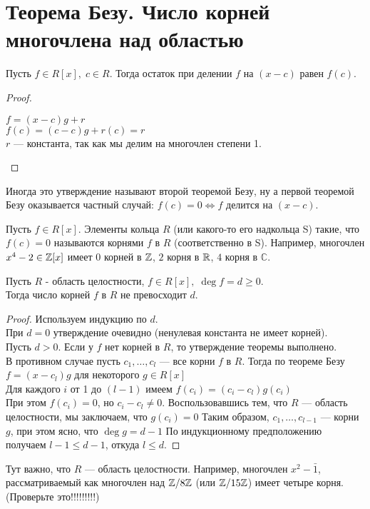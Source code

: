 
\section{Теорема Безу. Число корней многочлена над областью}
\begin{normalsize}
\begin{theorem-non}
    Пусть $f \in R[x],\; c \in R$. Тогда остаток при делении $f$ на $(x - c)$ равен $f(c)$.
\end{theorem-non}

\begin{proof}
    $ $ \\
    \begin{center}
        $f = (x-c)g + r$\\
        $f(c) = (c - c)g + r(c) = r$\\
        $r$ --- константа, так как мы делим на многочлен степени 1.
    \end{center}
    
\end{proof}

\notice Иногда это утверждение называют второй теоремой Безу, ну а первой теоремой Безу оказывается частный случай: $f(c) = 0 \Leftrightarrow f$ делится на $(x-c)$.

Пусть $f \in R[x]$. Элементы кольца $R$ (или какого-то его надкольца S) такие, что $f(c) = 0$ называются корнями $f$ в $R$ (соответственно в S).
Например, многочлен $x^4 - 2 \in \mathbb{Z}[x]$ имеет $0$ корней в $\mathbb{Z}$, $2$ корня в $\mathbb{R}$, $4$ корня в $\mathbb{C}$.

\begin{theorem-non}
    Пусть $R$ - область целостности, $f \in R[x],\; \deg f = d \geqslant 0$. \\
    Тогда число корней $f$ в $R$ не превосходит $d$.
\end{theorem-non}

\begin{proof}
    Используем индукцию по $d$. \\
    При $d = 0$ утверждение очевидно (ненулевая константа не имеет корней). \\
    Пусть $d > 0$. Если у $f$ нет корней в $R$, то утверждение теоремы выполнено. \\
    В противном случае пусть $c_1, \dots, c_l$ --- все корни $f$ в $R$. Тогда по теореме Безу
    $f = (x - c_l)g$ для некоторого $g \in R[x]$ \\
    Для каждого $i$ от 1 до $(l-1)$ имеем $f(c_i) = (c_i - c_l)g(c_i)$\\
    При этом $f(c_i) = 0$, но $c_i - c_l \neq 0$. Воспользовавшись тем, что $R$ --- область целостности, мы заключаем, что $g(c_i) = 0$
    Таким образом, $c_1,\dots,c_{l-1}$ --- корни $g$, при этом ясно, что $\deg g = d - 1$
    По индукционному предположению получаем $l - 1 \leqslant d - 1$, откуда $l \leqslant d$.
\end{proof}

\notice
Тут важно, что $R$  --- область целостности. Например, многочлен $x^2 - \bar{1}$, рассматриваемый как многочлен над $\mathbb{Z} / 8\mathbb{Z}$ (или $\mathbb{Z} / 15\mathbb{Z}$) имеет четыре корня. (Проверьте это!!!!!!!!!)
\end{normalsize}